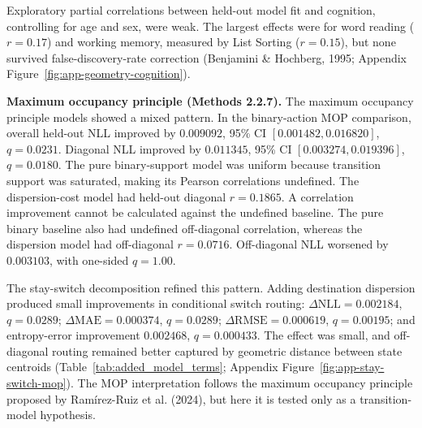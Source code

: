 \documentclass[12pt,a4paper]{report}
\begin{document}
Exploratory partial correlations between held-out model fit and cognition, controlling for age and sex, were weak. The largest effects were for word reading ($r = 0.17$) and working memory, measured by List Sorting ($r = 0.15$), but none survived false-discovery-rate correction (Benjamini \& Hochberg, 1995; Appendix Figure~\ref{fig:app-geometry-cognition}).
\vspace{1em}
\par\noindent\textbf{Maximum occupancy principle (Methods 2.2.7).}
The maximum occupancy principle models showed a mixed pattern. In the binary-action MOP comparison, overall held-out NLL improved by $0.009092$, 95\% CI $[0.001482,0.016820]$, $q=0.0231$. Diagonal NLL improved by $0.011345$, 95\% CI $[0.003274,0.019396]$, $q=0.0180$. The pure binary-support model was uniform because transition support was saturated, making its Pearson correlations undefined. The dispersion-cost model had held-out diagonal $r=0.1865$. A correlation improvement cannot be calculated against the undefined baseline. The pure binary baseline also had undefined off-diagonal correlation, whereas the dispersion model had off-diagonal $r=0.0716$. Off-diagonal NLL worsened by $0.003103$, with one-sided $q=1.00$.

The stay-switch decomposition refined this pattern. Adding destination dispersion produced small improvements in conditional switch routing: $\Delta\mathrm{NLL}=0.002184$, $q=0.0289$; $\Delta\mathrm{MAE}=0.000374$, $q=0.0289$; $\Delta\mathrm{RMSE}=0.000619$, $q=0.00195$; and entropy-error improvement $0.002468$, $q=0.000433$. The effect was small, and off-diagonal routing remained better captured by geometric distance between state centroids (Table~\ref{tab:added_model_terms}; Appendix Figure~\ref{fig:app-stay-switch-mop}). The MOP interpretation follows the maximum occupancy principle proposed by Ramírez-Ruiz et al. (2024), but here it is tested only as a transition-model hypothesis.
\end{document}
